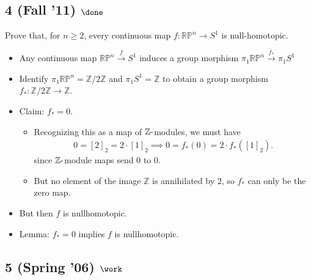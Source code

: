 \hypertarget{fall-11-done-1}{%
\subsection{\texorpdfstring{4 (Fall '11)
\(\done\)}{4 (Fall '11) \textbackslash done}}\label{fall-11-done-1}}

Prove that, for \(n \geq 2\), every continuous map
\(f: {\mathbb{RP}}^n \to S^1\) is null-homotopic.

\begin{solution}

\hfill

\begin{concept}

\hfill

\end{concept}

\begin{itemize}
\item
  Any continuous map \({\mathbb{RP}}^n \xrightarrow{f} S^1\) induces a
  group morphism \(\pi_1{\mathbb{RP}}^n \xrightarrow{f_*} \pi_1S^1\)
\item
  Identify \(\pi_1{\mathbb{RP}}^n = {\mathbb{Z}}/2{\mathbb{Z}}\) and
  \(\pi_1S^1 = {\mathbb{Z}}\) to obtain a group morphism
  \(f_*: {\mathbb{Z}}/2{\mathbb{Z}}\to {\mathbb{Z}}\).
\item
  Claim: \(f_* = 0\).

  \begin{itemize}
  \item
    Recognizing this as a map of \({\mathbb{Z}}{\hbox{-}}\)modules, we
    must have
    \begin{align*}  
    0 = [2]_2 = 2\cdot [1]_2  \implies 0 = f_*(0) = 2\cdot f_*([1]_2)
    .\end{align*}
    since \({\mathbb{Z}}{\hbox{-}}\)module maps send 0 to 0.
  \item
    But no element of the image \({\mathbb{Z}}\) is annihilated by
    \(2\), so \(f_*\) can only be the zero map.
  \end{itemize}
\item
  But then \(f\) is nullhomotopic.
\item
  Lemma: \(f_* = 0\) implies \(f\) is nullhomotopic. 
\end{itemize}

\end{solution}

\hypertarget{spring-06-work-6}{%
\subsection{\texorpdfstring{5 (Spring '06)
\(\work\)}{5 (Spring '06) \textbackslash work}}\label{spring-06-work-6}}


